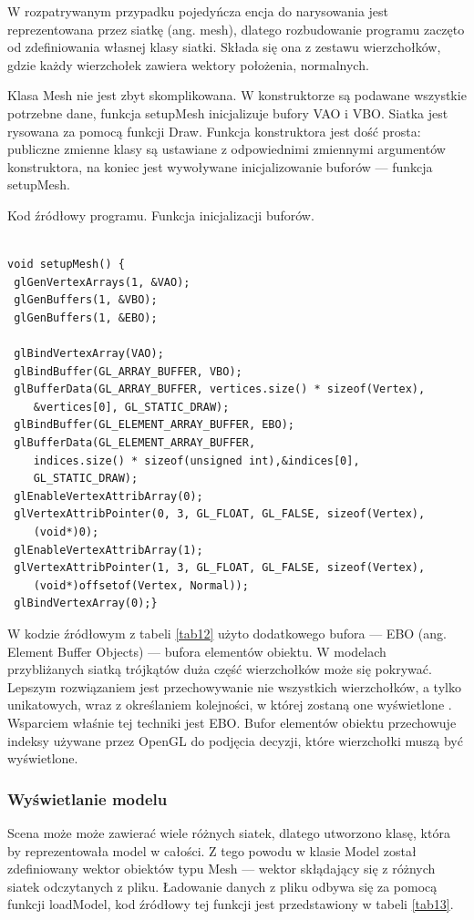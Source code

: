 W rozpatrywanym przypadku pojedyńcza encja do narysowania jest reprezentowana przez siatkę (ang. mesh), dlatego rozbudowanie programu zaczęto od zdefiniowania własnej klasy siatki. Składa się ona z zestawu wierzchołków, gdzie każdy wierzchołek zawiera wektory położenia, normalnych.

Klasa Mesh nie jest zbyt skomplikowana. W konstruktorze są podawane wszystkie potrzebne dane, funkcja setupMesh inicjalizuje bufory VAO i VBO. Siatka jest rysowana za pomocą funkcji Draw. Funkcja konstruktora jest dość prosta: publiczne zmienne klasy są ustawiane  z odpowiednimi zmiennymi argumentów konstruktora, na koniec jest wywoływane inicjalizowanie buforów --- funkcja setupMesh. 
\begin{table}[H]
\caption{Kod źródłowy programu. Funkcja inicjalizacji buforów.}
\label{tab12}
\begin{lstlisting}[frame=single]  % Start your code-block

void setupMesh() {
 glGenVertexArrays(1, &VAO);
 glGenBuffers(1, &VBO);
 glGenBuffers(1, &EBO);

 glBindVertexArray(VAO);
 glBindBuffer(GL_ARRAY_BUFFER, VBO);
 glBufferData(GL_ARRAY_BUFFER, vertices.size() * sizeof(Vertex), 
 	&vertices[0], GL_STATIC_DRAW);
 glBindBuffer(GL_ELEMENT_ARRAY_BUFFER, EBO);
 glBufferData(GL_ELEMENT_ARRAY_BUFFER, 
 	indices.size() * sizeof(unsigned int),&indices[0], 
 	GL_STATIC_DRAW);
 glEnableVertexAttribArray(0);
 glVertexAttribPointer(0, 3, GL_FLOAT, GL_FALSE, sizeof(Vertex), 
 	(void*)0);
 glEnableVertexAttribArray(1);
 glVertexAttribPointer(1, 3, GL_FLOAT, GL_FALSE, sizeof(Vertex),
 	(void*)offsetof(Vertex, Normal));
 glBindVertexArray(0);}
\end{lstlisting}
\end{table}

W kodzie źródłowym z tabeli \ref{tab12} użyto dodatkowego bufora --- EBO (ang. Element Buffer Objects) --- bufora elementów obiektu. W modelach przybliżanych siatką trójkątów duża część wierzchołków może się pokrywać. Lepszym rozwiązaniem jest przechowywanie nie wszystkich wierzchołków, a tylko unikatowych, wraz z określaniem kolejności, w której zostaną one wyświetlone \cite{learnopengl}. Wsparciem właśnie tej techniki jest EBO. Bufor elementów obiektu przechowuje indeksy używane przez OpenGL do podjęcia decyzji, które wierzchołki muszą być wyświetlone.

\subsubsection{Wyświetlanie modelu}
Scena może może zawierać wiele różnych siatek, dlatego utworzono klasę, która by reprezentowała model w całości. Z tego powodu w klasie Model został zdefiniowany wektor obiektów typu Mesh --- wektor skłądający się z różnych siatek odczytanych z pliku. Ładowanie danych z pliku odbywa się za pomocą funkcji loadModel, kod źródłowy tej funkcji jest przedstawiony w tabeli \ref{tab13}.

